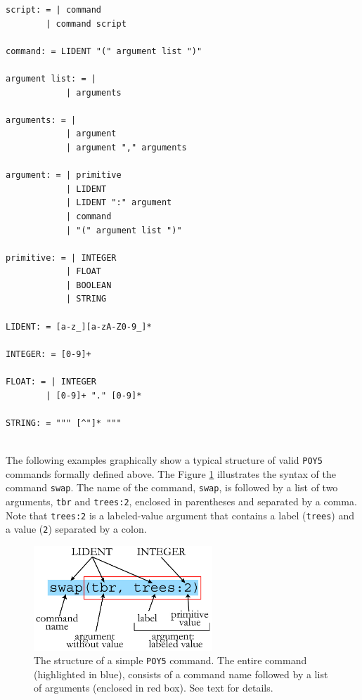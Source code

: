 \documentclass[11pt]{book}
\newcommand{\commandstyle}[1]{\texttt{#1}}
\newcommand{\poycommand}[1]{\commandstyle{#1}}
\newcommand{\poyargument}[1]{\commandstyle{#1}}
\newcommand{\poy}{\commandstyle{POY5}\xspace}
\begin{document}
\begin{verbatim}
script: = | command
        | command script

command: = LIDENT "(" argument list ")"

argument list: = |
            | arguments

arguments: = |
            | argument
            | argument "," arguments

argument: = | primitive
            | LIDENT
            | LIDENT ":" argument
            | command
            | "(" argument list ")"

primitive: = | INTEGER
            | FLOAT
            | BOOLEAN
            | STRING

LIDENT: = [a-z_][a-zA-Z0-9_]*

INTEGER: = [0-9]+

FLOAT: = | INTEGER
        | [0-9]+ "." [0-9]*

STRING: = """ [^"]* """


\end{verbatim}



The following examples graphically show a typical structure of valid \poy commands
formally defined above. The Figure \ref{simplecommand} illustrates
the syntax of the command \poycommand{swap}. The name of the
command, \poycommand{swap}, is followed by a list of two arguments,
\poyargument{tbr} and \poyargument{trees:2}, enclosed in parentheses
and separated by a comma. Note that \poyargument{trees:2} is a labeled-value
argument that contains a label (\texttt{trees}) and a value (\texttt{2})
separated by a colon.

\begin{figure}[htbp]
   \centering
   \includegraphics[width=0.60\textwidth]{doc/figures/fig-poycommand1.jpg}
   \caption{The structure of a simple \poy command. The entire command (highlighted
   in blue), consists of  a command name followed by a list of arguments (enclosed in red box).
   See text for details.}
   \label{simplecommand}
\end{figure}
\end{document}
